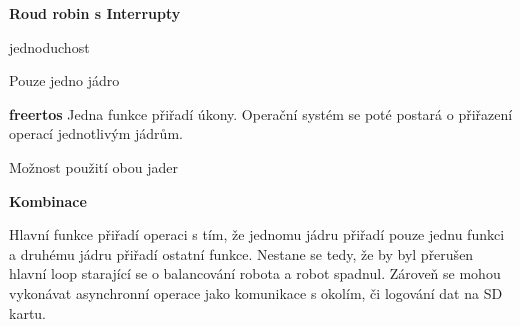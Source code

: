 \textbf{Roud robin s Interrupty}

jednoduchost

Pouze jedno jádro

\textbf{\ac{freertos}}
Jedna funkce přiřadí úkony. Operační systém se poté postará o přiřazení operací jednotlivým jádrům.

Možnost použití obou jader


\textbf{Kombinace}

Hlavní funkce přiřadí operaci s tím, že jednomu jádru přiřadí pouze jednu funkci a druhému jádru přiřadí ostatní funkce. Nestane se tedy, že by byl přerušen hlavní loop starající se o balancování robota a robot spadnul. Zároveň se mohou vykonávat asynchronní operace jako komunikace s okolím, či logování dat na SD kartu.